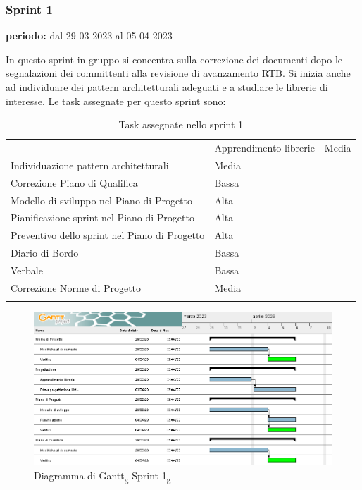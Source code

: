 \subsubsection{Sprint 1}
\begin{center}
\textbf{periodo:} dal 29-03-2023 al 05-04-2023\\
\end{center}
In questo sprint in gruppo si concentra sulla correzione dei documenti dopo le segnalazioni dei committenti alla revisione di avanzamento RTB.
Si inizia anche ad individuare dei pattern architetturali adeguati e a studiare le librerie di interesse. Le task assegnate per questo sprint sono:
\begin{longtable}{ 
	>{\centering}M{0.30\textwidth} 
	>{\centering}M{0.10\textwidth}
	}
	\rowcolorhead
	\centering 
	 &	
	\endfirsthead	
	\endhead
	
	Apprendimento librerie & Media \tabularnewline
	Individuazione pattern architetturali & Media \tabularnewline
	Correzione Piano di Qualifica & Bassa \tabularnewline
	Modello di sviluppo nel Piano di Progetto & Alta \tabularnewline
	Pianificazione sprint nel Piano di Progetto & Alta \tabularnewline
	Preventivo dello sprint nel Piano di Progetto & Alta \tabularnewline
	Diario di Bordo & Bassa \tabularnewline
	Verbale & Bassa \tabularnewline
	Correzione Norme di Progetto & Media \tabularnewline
	\captionline \caption{Task assegnate nello sprint 1}
\end{longtable}


\begin{figure}[H]
    \centering
    \includegraphics[scale=0.56]{image/gantt_sprint1.PNG}
    \caption{Diagramma di Gantt\textsubscript{g} Sprint 1\textsubscript{g}}
\end{figure}

